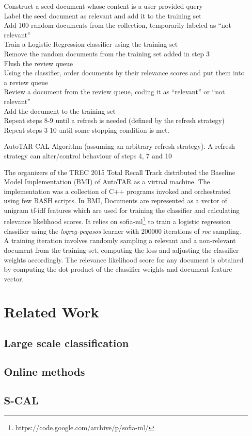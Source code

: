 \begin{algorithm}[]
Construct a seed document whose content is a user provided query\\
Label the seed document as relevant and add it to the training set \\
Add 100 random documents from the collection, temporarily labeled as ``not
relevant'' \\
Train a Logistic Regression classifier using the training set \\
Remove the random documents from the training set added in step 3 \\
Flush the review queue \\
Using the classifier, order documents by their relevance scores and put them
into a review queue \\ Review a document from the review queue, coding it as
``relevant'' or ``not relevant'' \\
Add the document to the training set \\
Repeat steps 8-9 until a refresh is needed (defined by the refresh strategy) \\
Repeat steps 3-10 until some stopping condition is met.
\caption{AutoTAR CAL Algorithm (assuming an arbitrary refresh strategy). A refresh
strategy can alter/control behaviour of steps 4, 7 and 10}
\label{alg.cal}
\end{algorithm}

The organizers of the TREC 2015 Total Recall Track distributed the Baseline
Model Implementation (BMI) of AutoTAR as a virtual machine. The implementation
was a collection of C++ programs invoked and orchestrated using few BASH
scripts.  In BMI, Documents are represented as a vector of unigram tf-idf
features which are used for training the classifier and calculating relevance
likelihood scores. It relies on
sofia-ml\footnote{https://code.google.com/archive/p/sofia-ml/}
\cite{sculley2010combined} to train a logistic regression classifier using the
\textit{logreg-pegasos} learner with $200000$ iterations of \textit{roc}
sampling. A training iteration involves randomly sampling a relevant and a
non-relevant document from the training set, computing the loss and adjusting
the classifier weights accordingly. The relevance likelihood score for any
document is obtained by computing the dot product of the classifier weights and
document feature vector.

\section{Related Work}
\subsection{Large scale classification}
\subsection{Online methods}
\subsection{S-CAL}
